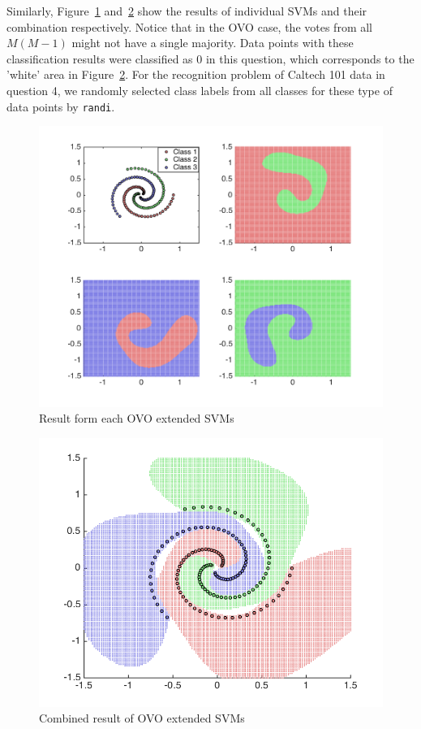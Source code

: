 \documentclass[10pt,twocolumn,letterpaper]{article}
\begin{document}
Similarly, Figure~\ref{fig:q2_ovo_3} and~\ref{fig:q2_ovo} show the results of individual SVMs and their combination respectively. Notice that in the OVO case, the votes from all $M(M-1)$ might not have a single majority. Data points with these classification results were classified as 0 in this question, which corresponds to the 'white' area in Figure~\ref{fig:q2_ovo}. For the recognition problem of Caltech 101 data in question 4, we randomly selected class labels from all classes for these type of data points by \texttt{randi}. 

\begin{figure}
	\begin{center}
		\includegraphics[width=0.8\linewidth]{q2_ovo_3}
		\caption{Result form each OVO extended SVMs}
		\label{fig:q2_ovo_3}
	\end{center}
\end{figure}

\begin{figure}
	\begin{center}
		\includegraphics[width=0.8\linewidth]{q2_ovo}
		\caption{Combined result of OVO extended SVMs}
		\label{fig:q2_ovo}
	\end{center}
\end{figure}
\end{document}
